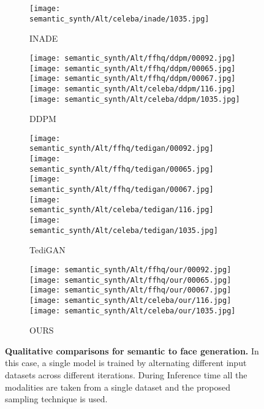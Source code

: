 \documentclass[10pt,twocolumn,letterpaper]{article}
\begin{document}
\begin{figure*}[t!]
\begin{subfigure}[t]{0.137\linewidth}
      \texttt{[image: semantic\_synth/Alt/celeba/inade/1035.jpg]}
      \caption{INADE\cite{tan2021diverse}}
    \end{subfigure}
    \begin{subfigure}[t]{0.137\linewidth}
      \captionsetup{justification=centering, labelformat=empty, font=scriptsize}
\texttt{[image: semantic\_synth/Alt/ffhq/ddpm/00092.jpg]}
   \texttt{[image: semantic\_synth/Alt/ffhq/ddpm/00065.jpg]}
      \texttt{[image: semantic\_synth/Alt/ffhq/ddpm/00067.jpg]}
\texttt{[image: semantic\_synth/Alt/celeba/ddpm/116.jpg]}
      \texttt{[image: semantic\_synth/Alt/celeba/ddpm/1035.jpg]}
      \caption{DDPM\cite{ho2020denoising}}
    \end{subfigure}
    \begin{subfigure}[t]{0.137\linewidth}
      \captionsetup{justification=centering, labelformat=empty, font=scriptsize}
\texttt{[image: semantic\_synth/Alt/ffhq/tedigan/00092.jpg]}
   \texttt{[image: semantic\_synth/Alt/ffhq/tedigan/00065.jpg]}
      \texttt{[image: semantic\_synth/Alt/ffhq/tedigan/00067.jpg]}
\texttt{[image: semantic\_synth/Alt/celeba/tedigan/116.jpg]}
      \texttt{[image: semantic\_synth/Alt/celeba/tedigan/1035.jpg]}
      \caption{TediGAN\cite{xia2021tedigan}}
    \end{subfigure}
    \begin{subfigure}[t]{0.137\linewidth}
      \captionsetup{justification=centering, labelformat=empty, font=scriptsize}
\texttt{[image: semantic\_synth/Alt/ffhq/our/00092.jpg]}
   \texttt{[image: semantic\_synth/Alt/ffhq/our/00065.jpg]}
      \texttt{[image: semantic\_synth/Alt/ffhq/our/00067.jpg]}
\texttt{[image: semantic\_synth/Alt/celeba/our/116.jpg]}
      \texttt{[image: semantic\_synth/Alt/celeba/our/1035.jpg]}
      \caption{OURS}
    \end{subfigure}
    \vspace{-3mm}    \caption{\textbf{Qualitative comparisons for semantic to face generation.} In this case, a single model is trained by alternating different input datasets across different iterations. During Inference time all the modalities are taken from a single dataset and the proposed sampling technique is used.}
    \label{fig:facesematicsupp}
  \end{figure*}
\end{document}
